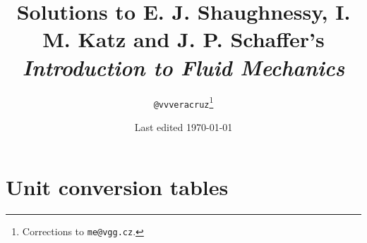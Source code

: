 \documentclass[a4paper]{report}
\title{Solutions to E. J. Shaughnessy, I. M. Katz and J. P. Schaffer's \textit{Introduction to Fluid Mechanics}}
\date{Last edited \today}
\author{\texttt{@vvveracruz}\thanks{Corrections to \texttt{me@vgg.cz}.}}
\begin{document}
\maketitle

\chapter{}
  


\appendix

\chapter{Unit conversion tables}
  

\printbibliography
{}
\end{document}
